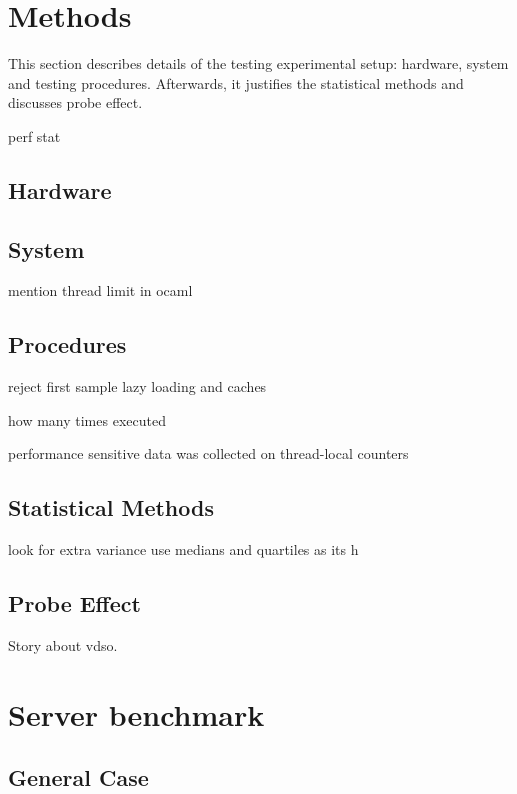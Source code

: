 \documentclass[12pt,a4paper,twoside]{report}
\begin{document}
\section{Methods}

This section describes details of the testing experimental setup: hardware, system and testing procedures. Afterwards, it justifies the statistical methods and discusses probe effect.

perf stat

\subsection{Hardware}

\subsection{System}
\label{section:methods_system}
mention thread limit in ocaml
\subsection{Procedures}
reject first sample lazy loading and caches

how many times executed

performance sensitive data was collected on thread-local counters
\subsection{Statistical Methods}

look for extra variance
use medians and quartiles as its h
\subsection{Probe Effect}

Story about vdso.







\section{Server benchmark} 

\subsection{General Case}
\label{section:benchmark-general-case}
\end{document}
